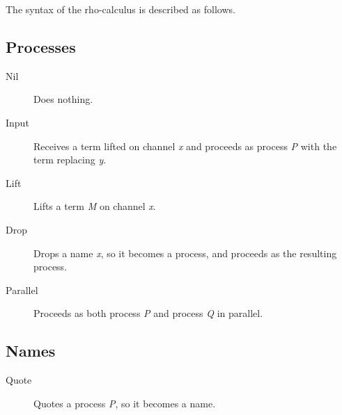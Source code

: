 The syntax of the rho-calculus is described as follows.

\subsection{Processes}
\begin{description}
\item[Nil] Does nothing.
\item[Input] Receives a term lifted on channel \textit{x} and proceeds as process \textit{P} with the term replacing \textit{y}.
\item[Lift] Lifts a term \textit{M} on channel \textit{x}.
\item[Drop] Drops a name \textit{x}, so it becomes a process, and proceeds as the resulting process.
\item[Parallel] Proceeds as both process \textit{P} and process \textit{Q} in parallel.
\end{description}


\subsection{Names}
\begin{description}
\item[Quote] Quotes a process \textit{P}, so it becomes a name.
\end{description}


